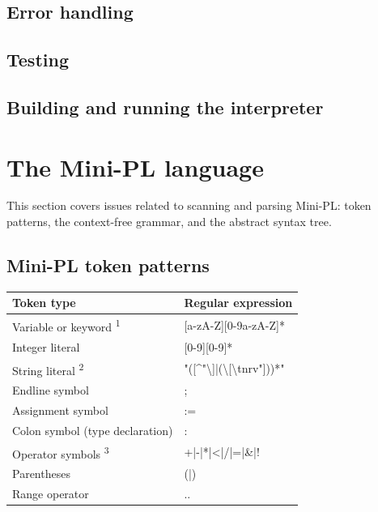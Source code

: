 \documentclass[a4paper,11pt]{article}
\begin{document}
\subsection{Error handling}

\subsection{Testing}

\subsection{Building and running the interpreter}

\section{The Mini-PL language}

This section covers issues related to scanning and parsing Mini-PL: token patterns, the context-free grammar, and the abstract syntax tree.

\subsection{Mini-PL token patterns}

\begin{table}[h!]
\begin{tabular}{| l | l |}
    \hline
    Token type & Regular expression \\
    \hline
    Variable or keyword \textsuperscript{1} & [a-zA-Z][0-9a-zA-Z]* \\
    \hline
    Integer literal & [0-9][0-9]* \\
    \hline
    String literal \textsuperscript{2} & "([\^{}"\textbackslash]|(\textbackslash[\textbackslash tnrv"]))*" \\
    \hline
    Endline symbol & ; \\
    \hline
    Assignment symbol & := \\
    \hline
    Colon symbol (type declaration) & : \\
    \hline
    Operator symbols \textsuperscript{3} & +|-|*|<|/|=|\&|! \\
    \hline
    Parentheses & (|) \\
    \hline
    Range operator & .. \\
    \hline
\end{tabular}
\end{table}
\end{document}
